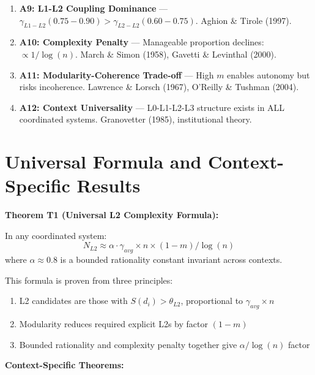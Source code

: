 \begin{enumerate}
\item \textbf{A9: L1-L2 Coupling Dominance} — $\gamma_{L1-L2} (0.75-0.90) > \gamma_{L2-L2} (0.60-0.75)$. Aghion \& Tirole (1997).

\item \textbf{A10: Complexity Penalty} — Manageable proportion declines: $\propto 1/\log(n)$. March \& Simon (1958), Gavetti \& Levinthal (2000).

\item \textbf{A11: Modularity-Coherence Trade-off} — High $m$ enables autonomy but risks incoherence. Lawrence \& Lorsch (1967), O'Reilly \& Tushman (2004).

\item \textbf{A12: Context Universality} — L0-L1-L2-L3 structure exists in ALL coordinated systems. Granovetter (1985), institutional theory.

\end{enumerate}


\section{Universal Formula and Context-Specific Results}

\textbf{Theorem T1 (Universal L2 Complexity Formula):}

In any coordinated system:
\[
N_{L2} \approx \alpha \cdot \gamma_{avg} \times n \times (1-m) / \log(n)
\]
where $\alpha \approx 0.8$ is a bounded rationality constant invariant across contexts.

This formula is proven from three principles:
\begin{enumerate}[nosep]
    \item L2 candidates are those with $S(d_i) > \theta_{L2}$, proportional to $\gamma_{avg} \times n$
    \item Modularity reduces required explicit L2s by factor $(1-m)$
    \item Bounded rationality and complexity penalty together give $\alpha / \log(n)$ factor
\end{enumerate}

\textbf{Context-Specific Theorems:}

